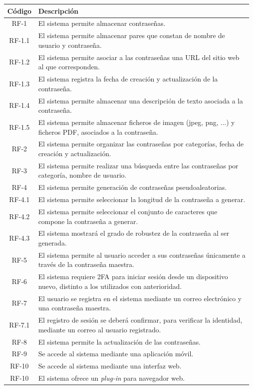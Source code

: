 \documentclass{article}
\begin{document}
\begin{table}[H]
    \centering
    \begin{tabular}{| c | p{30em} |}
    \hline
        Código &  Descripción  \\ \hline
        RF-1 & El sistema permite almacenar contraseñas. \\ \hline
        RF-1.1 & El sistema permite almacenar pares que constan de nombre de usuario y contraseña.  \\ \hline
        RF-1.2 & El sistema permite asociar a las contraseñas una URL del sitio web al que corresponden. \\ \hline
        RF-1.3 & El sistema registra la fecha de creación y actualización de la contraseña. \\ \hline
        RF-1.4 & El sistema permite almacenar una descripción de texto asociada a la contraseña. \\ \hline
        RF-1.5 & El sistema permite almacenar ficheros de imagen (jpeg, png, ...) y ficheros PDF, asociados a la contraseña. \\ \hline
        RF-2 & El sistema permite organizar las contraseñas por categorías, fecha de creación y actualización. \\ \hline
        RF-3 & El sistema permite realizar una búsqueda entre las contraseñas por categoría, nombre de usuario.  \\ \hline
        RF-4 & El sistema permite generación de contraseñas pseudoaleatorias. \\ \hline
        RF-4.1 & El sistema permite seleccionar la longitud de la contraseña a generar.\\ \hline
        RF-4.2 & El sistema permite seleccionar el conjunto de caracteres que compone la contraseña a generar.\\ \hline
        RF-4.3 & El sistema mostrará el grado de robustez de la contraseña al ser generada. \\ \hline
        RF-5 & El sistema permite al usuario acceder a sus contraseñas únicamente a través de la contraseña maestra. \\ \hline
        RF-6 & El sistema requiere 2FA para iniciar sesión desde un dispositivo nuevo, distinto a los utilizados con anterioridad. \\ \hline
        RF-7 & El usuario se registra en el sistema mediante un correo electrónico y una contraseña maestra.\\ \hline
        RF-7.1 & El registro de sesión se deberá confirmar, para verificar la identidad, mediante un correo al usuario registrado. \\ \hline
        RF-8 & El sistema permite la actualización de las contraseñas. \\ \hline
        RF-9 & Se accede al sistema mediante una aplicación móvil. \\ \hline
        RF-10 & Se accede al sistema mediante una interfaz web. \\ \hline
        RF-10 & El sistema ofrece un \textit{plug-in} para navegador web. \\ \hline
    \end{tabular}
\end{table}
\end{document}
